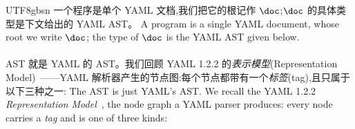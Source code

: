 \begin{CJK*}{UTF8}{gbsn}
\ifPaperChinese
一个程序是单个 YAML 文档,我们把它的根记作 $\doc$;$\doc$ 的具体类型是下文给出的 YAML AST。
\else
A program is a single YAML document, whose root we write $\doc$; the type
of $\doc$ is the YAML AST given below.
\fi

\paragraph{}
\ifPaperChinese
AST 就是 YAML 的 AST。我们回顾 YAML 1.2.2 的\emph{表示模型}(Representation Model)~\cite{ben-kiki2021-yaml}——YAML 解析器产生的节点图:每个节点都带有一个\emph{标签}(tag),且只属于以下三种之一:
\else
The AST is just YAML's AST. We recall the YAML 1.2.2 \emph{Representation
Model}~\cite{ben-kiki2021-yaml}, the node graph a YAML parser produces: every node carries
a \emph{tag} and is one of three kinds:
\fi


\end{CJK*}

